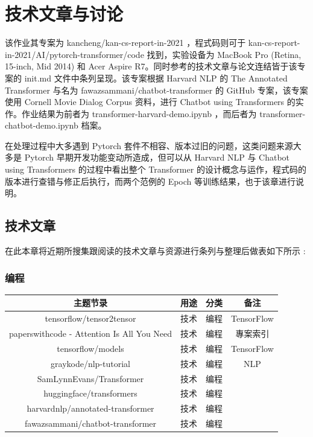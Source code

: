 \chapter{技术文章与讨论}
\label{chap:3}

该作业其专案为 kancheng/kan-cs-report-in-2021 ，程式码则可于 kan-cs-report-in-2021/AI/pytorch-transformer/code 找到，实验设备为 MacBook Pro (Retina, 15-inch, Mid 2014) 和 Acer Aspire R7。同时参考的技术文章与论文连结皆于该专案的 init.md 文件中条列呈现。该专案根据 Harvard NLP 的 The Annotated Transformer 与名为 fawazsammani/chatbot-transformer 的 GitHub 专案，该专案使用 Cornell Movie Dialog Corpus 资料，进行 Chatbot using Transformers 的实作。作业结果为前者为 transformer-harvard-demo.ipynb ，而后者为 transformer-chatbot-demo.ipynb 档案。

在处理过程中大多遇到 Pytorch 套件不相容、版本过旧的问题，这类问题来源大多是 Pytorch 早期开发功能变动所造成，但可以从 Harvard NLP 与 Chatbot using Transformers 的过程中看出整个 Transformer 的设计概念与运作，程式码的版本进行查错与修正后执行，而两个范例的 Epoch 等训练结果，也于该章进行说明。

\section{技术文章}

在此本章将近期所搜集跟阅读的技术文章与资源进行条列与整理后做表如下所示 :

\subsection{编程}

\begin{center}
\begin{tabular}{cccc}
\hline
主题节录 & 用途 & 分类 & 备注  \\
\hline
tensorflow/tensor2tensor \cite{githubtfws} & 技术 & 编程 & TensorFlow \\
paperswithcode - Attention Is All You Need \cite{pwcws} & 技术 & 编程 & 專案索引 \\
tensorflow/models \cite{githubtfmdws} & 技术 & 编程 & TensorFlow \\
graykode/nlp-tutorial \cite{graykodemdws} & 技术 & 编程 & NLP \\
SamLynnEvans/Transformer \cite{sletferws} & 技术 & 编程 &  \\
huggingface/transformers \cite{huggingfacemdws} & 技术 & 编程 &  \\
harvardnlp/annotated-transformer \cite{harvardnlpatf} & 技术 & 编程 &  \\
fawazsammani/chatbot-transformer \cite{fawazsammanitf17} & 技术 & 编程 &  \\
\hline
\end{tabular}
\end{center}

